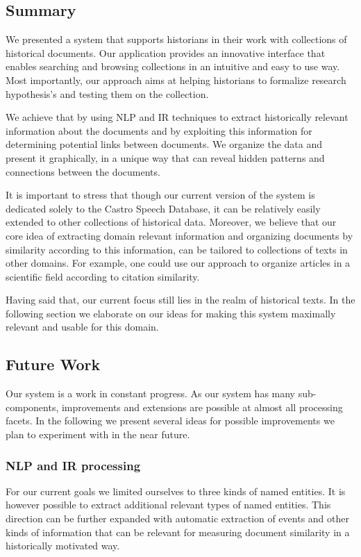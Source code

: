 \subsection {Summary}
\label{sec:summary}

We presented a system that supports historians in their work with collections of historical documents. 
Our application provides an innovative interface that enables searching and browsing collections in an intuitive and easy to use way.
Most importantly, our approach aims at helping historians to formalize research hypothesis's and testing them on the collection.

We achieve that by using NLP and IR techniques to extract historically relevant information about the documents and by exploiting
this information for determining potential links between documents. We organize the data and present it graphically,
in a unique way that can reveal hidden patterns and connections between the documents.
 
It is important to stress that though our current version of the system is dedicated solely to the Castro Speech Database, 
it can be relatively easily extended to other collections of historical data. Moreover, we believe that our core idea of
extracting domain relevant information and organizing documents by similarity according to this information, can be tailored
to collections of texts in other domains. For example, one could use our approach to organize articles in a scientific field 
according to citation similarity. 

Having said that, our current focus still lies in the realm of historical texts. In the following section we elaborate on
our ideas for making this system maximally relevant and usable for this domain. 
 

\subsection {Future Work}
\label{sec:future_work}
Our system is a work in constant progress. As our system has many sub-components, improvements and extensions are possible
at almost all processing facets. In the following we present several ideas for possible improvements we plan to experiment with in the
near future.

\subsubsection{NLP and IR processing}
For our current goals we limited ourselves to three kinds of named entities. 
It is however possible to extract additional relevant types of named entities. 
This direction can be further expanded with automatic extraction of events and other kinds of information that can be relevant for measuring 
document similarity in a historically motivated way.  

